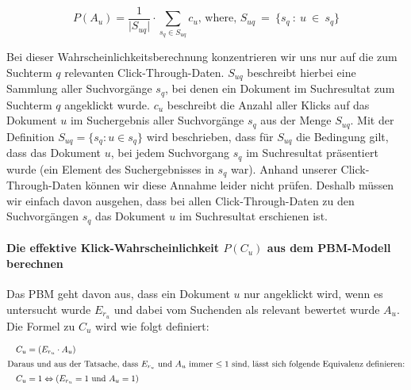 \vspace{-1.5em}
\begin{equation}	
	P(A_{u}) = \frac{1}{\vert S_{uq} \vert} \cdot \sum\limits_{s_q \in S_{uq}}{c_{u}\text{, where, } S_{uq}\ =\ \lbrace s_q\ :\ u\ \in\ s_q \rbrace}
\end{equation}
\vspace{-1em}

Bei dieser Wahrscheinlichkeitsberechnung konzentrieren wir uns nur auf die zum Suchterm $q$ relevanten Click-Through-Daten. $S_{uq}$ beschreibt hierbei eine Sammlung aller Suchvorgänge $s_q$, bei denen ein Dokument im Suchresultat zum Suchterm $q$ angeklickt wurde. $c_{u}$ beschreibt die Anzahl aller Klicks auf das Dokument $u$ im Suchergebnis aller Suchvorgänge $s_q$ aus der Menge $S_{uq}$. Mit der Definition $S_{uq} = \lbrace s_q : u \in s_q \rbrace$ wird beschrieben, dass für $S_{uq}$ die Bedingung gilt, dass das Dokument $u$, bei jedem Suchvorgang $s_q$ im Suchresultat präsentiert wurde (ein Element des Suchergebnisses in $s_q$ war). Anhand unserer Click-Through-Daten können wir diese Annahme leider nicht prüfen. Deshalb müssen wir einfach davon ausgehen, dass bei allen Click-Through-Daten zu den Suchvorgängen $s_q$ das Dokument $u$ im Suchresultat erschienen ist. 

\paragraph{Die effektive Klick-Wahrscheinlichkeit $P(C_{u})$ aus dem PBM-Modell berechnen}
Das PBM geht davon aus, dass ein Dokument $u$ nur angeklickt wird, wenn es untersucht wurde $E_{r_{u}}$ und dabei vom Suchenden als relevant bewertet wurde $A_{u}$. Die Formel zu $C_{u}$ wird wie folgt definiert:

\vspace{-2em}
\begin{spacing}{1}
\begin{align}
	&&	C_{u} &= \left(E_{r_{u}} \cdot A_{u}\right) &\\
  \intertext{Daraus und aus der Tatsache, dass $E_{r_{u}}$ und $A_{u}$ immer $\leq 1$ sind, lässt sich folgende Equivalenz definieren:}
  &&	C_{u} &= 1\Leftrightarrow \left(E_{r_{u}} = 1 \text{ und } A_{u} = 1\right)
\end{align}
\end{spacing}
\vspace{-1em}


